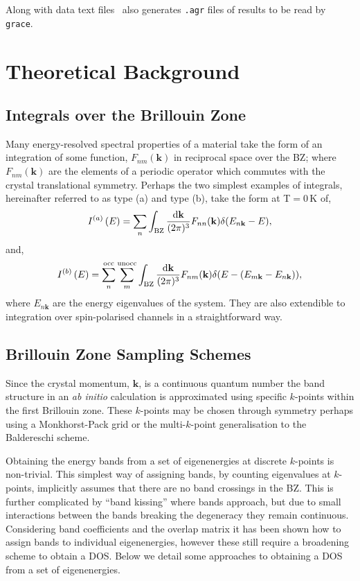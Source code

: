 \documentclass[a4paper,11pt,twoside]{book}
\newcommand{\kbf}{\mathbf{k}}
\renewcommand{\d}{\mathrm{d}}
\begin{document}
Along with data text files \optados\ also generates \verb#.agr# files of results to be read by \verb#grace#.




\chapter{Theoretical Background} \label{sec:theory}

\section{Integrals over the Brillouin Zone}

Many energy-resolved spectral properties of a material take the form of an integration of some function, $F_{nm}(\kbf)$ in  reciprocal space over the BZ; where $F_{nm}(\kbf)$ are the elements of a periodic operator which commutes with the crystal translational symmetry.
%
Perhaps the two simplest examples of integrals, hereinafter referred to as type (a) and type (b), take the form at T$=0\,$K of,
\begin{equation}
I^{(a)} \left ( E \right) = \sum_n \int_{\rm BZ} \frac {\d\kbf}{(2\pi)^3} F_{nn}(\kbf) \delta (E_{n\kbf}-E),
\end{equation}
and,
\begin{equation}
I^{(b)} \left ( E \right) = \sum^{\rm occ}_n \sum^{\rm unocc}_m
\int_{\rm BZ} \frac {\d\kbf}{(2\pi)^3} F_{nm}(\kbf) \delta ( E - (E_{m\kbf}-E_{n\kbf})),
\label{Eqn:IntB}
\end{equation}
where $E_{n\kbf}$ are the energy eigenvalues of the system.
%
They are also extendible to integration over spin-polarised channels
in a straightforward way.

\section{Brillouin Zone Sampling Schemes}

Since the crystal momentum, $\kbf$, is a continuous quantum number the band structure in an \emph{ab initio} calculation is approximated using specific $k$-points within the first Brillouin zone.
%
These $k$-points may be chosen through symmetry perhaps using a Monkhorst-Pack grid \cite{monkhorst:PRB:1976} or  the multi-$k$-point generalisation to the Baldereschi scheme\cite{rajagopal:PRL:1994,morris:PRB:2008}.


Obtaining the energy bands from a set of eigenenergies at discrete $k$-points is non-trivial.
%
This simplest way of assigning bands, by counting eigenvalues at $k$-points, implicitly assumes that there are no band crossings in the BZ.
%
This is further complicated by ``band kissing'' where bands approach, but due to small interactions between the bands breaking the degeneracy they remain continuous\cite{blochl:PRB:1994,pickard:PRB:1999}.
%
Considering band coefficients and the overlap matrix it has been shown how to assign bands to individual eigenenergies\cite{yazyev:PRB:2002,refson:o2b}, however these still require a broadening scheme to obtain a DOS.
%
Below we detail some approaches to obtaining a DOS from a set of eigenenergies.
\end{document}
